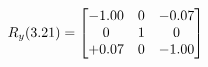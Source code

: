 \documentclass[preview]{standalone}
\begin{document}
\begin{align*}
\special{dvisvgm:raw <g id='unique000'>}R_{y}(3.21) = \begin{bmatrix}-1.00 & 0 & -0.07 \\0 & 1 & 0 \\+0.07 & 0 & -1.00\end{bmatrix}\special{dvisvgm:raw </g>}
\end{align*}
\end{document}
